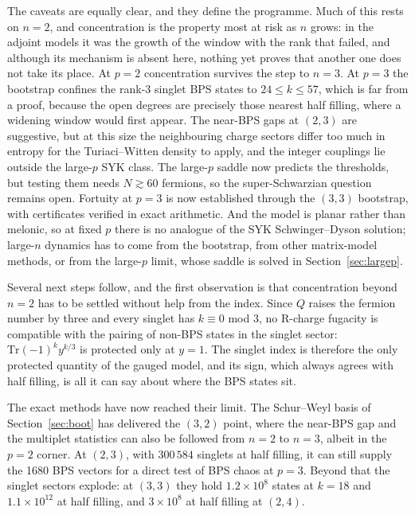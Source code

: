 \documentclass[10pt]{article}
\newcommand{\Tr}{\mathrm{Tr}}
\begin{document}
The caveats are equally clear, and they define the programme. Much of this rests on $n=2$, and concentration is the
property most at risk as $n$ grows: in the adjoint models it was the growth of the window with the rank that failed,
and although its mechanism is absent here, nothing yet proves that another one does not take its place. At $p=2$
concentration survives the step to $n=3$. At $p=3$ the bootstrap confines the rank-3 singlet BPS states to
$24\le k\le57$, which is far from a proof, because the open degrees are precisely those nearest half filling, where a
widening window would first appear. The near-BPS gaps at $(2,3)$ are suggestive, but at this size the neighbouring
charge sectors differ too much in entropy for the Turiaci--Witten density to apply, and the integer couplings lie
outside the large-$p$ SYK class. The large-$p$ saddle now predicts the thresholds, but testing them needs
$N\gtrsim60$ fermions, so the super-Schwarzian question remains open. Fortuity at $p=3$ is now established through the $(3,3)$ bootstrap, with certificates verified
in exact arithmetic. And the model is planar rather than melonic, so at fixed $p$ there is no analogue of the SYK
Schwinger--Dyson solution; large-$n$ dynamics has to come from the bootstrap, from other matrix-model methods, or from
the large-$p$ limit, whose saddle is solved in Section~\ref{sec:largep}.

Several next steps follow, and the first observation is that concentration beyond $n=2$ has to be settled without
help from the index. Since $Q$ raises the fermion number by three and every singlet has $k\equiv0$ mod 3, no
R-charge fugacity is compatible with the pairing of non-BPS states in the singlet sector: $\Tr(-1)^ky^{k/3}$ is
protected only at $y=1$. The singlet index is therefore the only protected quantity of the gauged model, and its
sign, which always agrees with half filling, is all it can say about where the BPS states sit.

The exact methods have now reached their limit. The Schur--Weyl basis of Section~\ref{sec:boot} has delivered the
$(3,2)$ point, where the near-BPS gap and the multiplet statistics can also be followed from $n=2$ to $n=3$, albeit in
the $p=2$ corner. At $(2,3)$, with $300\,584$ singlets at half filling, it can still supply the 1680 BPS vectors for a
direct test of BPS chaos at $p=3$. Beyond that the singlet sectors explode: at $(3,3)$ they hold $1.2\times10^8$ states
at $k=18$ and $1.1\times10^{12}$ at half filling, and $3\times10^8$ at half filling at $(2,4)$.
\end{document}
